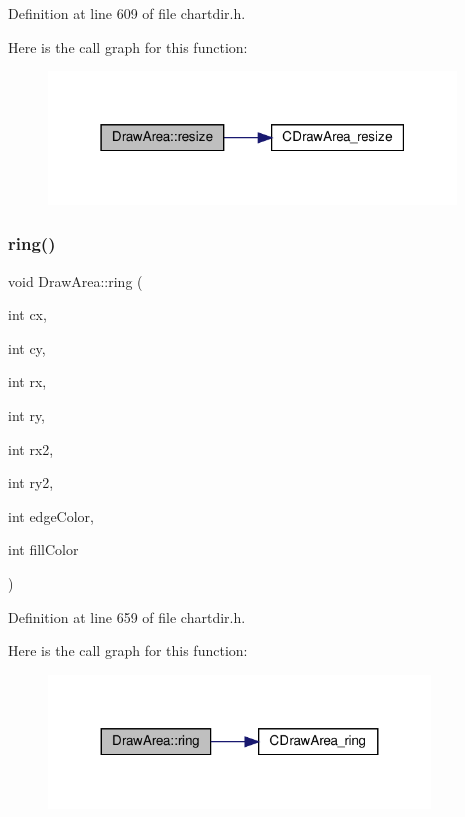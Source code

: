 Definition at line 609 of file chartdir.\+h.

Here is the call graph for this function\+:
\nopagebreak
\begin{figure}[H]
\begin{center}
\leavevmode
\includegraphics[width=307pt]{class_draw_area_ac5d26003a57fdab61b98ec6464af27e9_cgraph}
\end{center}
\end{figure}
\mbox{\label{class_draw_area_a53ae627b3687d63a7aa02b851cee8f4a}} 
\subsubsection{\texorpdfstring{ring()}{ring()}}
{\footnotesize\ttfamily void Draw\+Area\+::ring (\begin{DoxyParamCaption}\item[{int}]{cx,  }\item[{int}]{cy,  }\item[{int}]{rx,  }\item[{int}]{ry,  }\item[{int}]{rx2,  }\item[{int}]{ry2,  }\item[{int}]{edge\+Color,  }\item[{int}]{fill\+Color }\end{DoxyParamCaption})\hspace{0.3cm}{\ttfamily [inline]}}



Definition at line 659 of file chartdir.\+h.

Here is the call graph for this function\+:
\nopagebreak
\begin{figure}[H]
\begin{center}
\leavevmode
\includegraphics[width=287pt]{class_draw_area_a53ae627b3687d63a7aa02b851cee8f4a_cgraph}
\end{center}
\end{figure}
\mbox{\label{class_draw_area_a12358fa55f0f6071857ac5231f26efa7}} 
